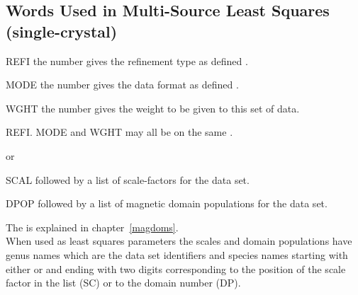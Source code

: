 \subsection{Words Used in Multi-Source Least Squares (single-crystal)}
\hypertarget{Q:sorc}{}
\begin{list} {} {\setlength{\labelwidth}{ 3 cm}
                 \setlength{\parsep}{-1ex}
                 \setlength{\leftmargin}{\labelwidth}}
\item[REFI] the number gives the refinement type as defined .
\item[MODE] the number gives the data format as defined  .
\item[WGHT] the number gives the weight to be given to this set of data.
\item{} REFI. MODE and WGHT may all be on the same .
\item[or]
\item[SCAL] followed by a list of scale-factors for the data set.
\item[DPOP] followed by a list of magnetic domain populations for the  data set.
\end{list}
The  is explained in chapter~\ref{magdoms}.\\
When used as least squares parameters the scales and domain populations have genus 
names which are the data set identifiers and species names starting with either
 or  and ending with two digits corresponding to the position of the
scale factor in the list (SC) or to the domain number (DP). 
